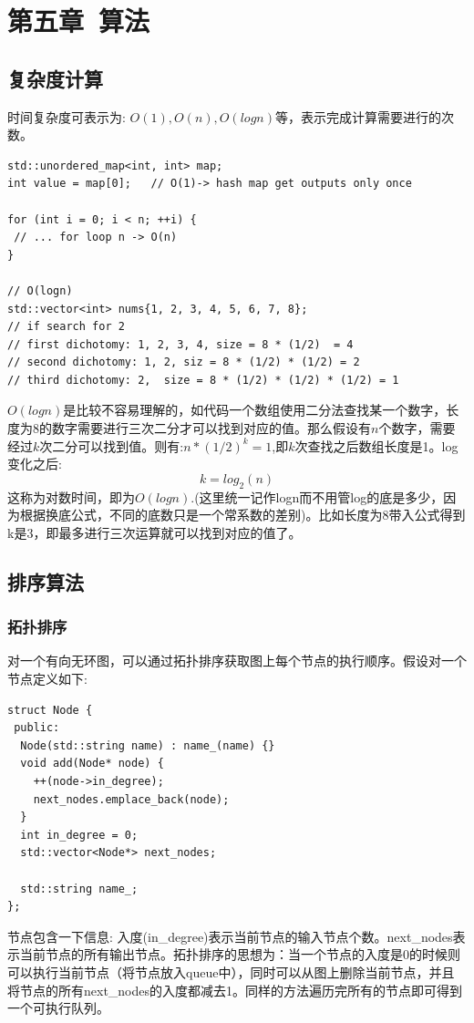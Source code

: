 \documentclass[12pt]{book}
\begin{document}
\newpage

\fancyhead{}

\chapter{第五章\ 算法}
\section{复杂度计算}
时间复杂度可表示为: $O(1), O(n), O(logn)$等，表示完成计算需要进行的次数。
\begin{lstlisting}
std::unordered_map<int, int> map;
int value = map[0];   // O(1)-> hash map get outputs only once

for (int i = 0; i < n; ++i) {
 // ... for loop n -> O(n)
}

// O(logn)
std::vector<int> nums{1, 2, 3, 4, 5, 6, 7, 8};
// if search for 2
// first dichotomy: 1, 2, 3, 4, size = 8 * (1/2)  = 4
// second dichotomy: 1, 2, siz = 8 * (1/2) * (1/2) = 2
// third dichotomy: 2,  size = 8 * (1/2) * (1/2) * (1/2) = 1
\end{lstlisting}
$O(logn)$是比较不容易理解的，如代码一个数组使用二分法查找某一个数字，长度为8的数字需要进行三次二分才可以找到对应的值。那么假设有$n$个数字，需要经过$k$次二分可以找到值。则有:$n * (1/2)^k = 1$,即$k$次查找之后数组长度是1。log变化之后:
\begin{equation}\label{log-algorithm-time}
k = log_2(n)
\end{equation}
这称为对数时间，即为$O(logn)$.(这里统一记作logn而不用管log的底是多少，因为根据换底公式，不同的底数只是一个常系数的差别)。比如长度为8带入公式得到k是3，即最多进行三次运算就可以找到对应的值了。

\section{排序算法}
\subsection{拓扑排序}
对一个有向无环图，可以通过拓扑排序获取图上每个节点的执行顺序。假设对一个节点定义如下:
\begin{lstlisting}
struct Node {
 public:
  Node(std::string name) : name_(name) {}
  void add(Node* node) {
	++(node->in_degree);
	next_nodes.emplace_back(node);
  }
  int in_degree = 0;
  std::vector<Node*> next_nodes;
	
  std::string name_;
};
\end{lstlisting}
节点包含一下信息: 入度(in\_degree)表示当前节点的输入节点个数。next\_nodes表示当前节点的所有输出节点。拓扑排序的思想为：当一个节点的入度是0的时候则可以执行当前节点（将节点放入queue中），同时可以从图上删除当前节点，并且将节点的所有next\_nodes的入度都减去1。同样的方法遍历完所有的节点即可得到一个可执行队列。
\end{document}
